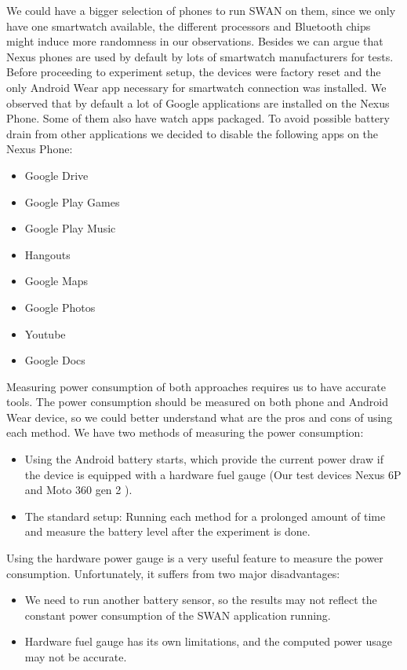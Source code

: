  We could have a bigger selection of phones to run SWAN on them, since we only have one smartwatch available,
 the different processors  and Bluetooth chips might induce more randomness in our observations.
 Besides we can argue that Nexus phones are used by default by lots of smartwatch manufacturers for tests.
 Before proceeding to experiment setup, the devices were factory reset and the only Android Wear app necessary for smartwatch connection was installed.
 We observed that by default a lot of Google applications are installed on the Nexus Phone. Some of them also have watch apps packaged.
 To avoid possible battery drain from other applications we decided to disable the following apps on the Nexus Phone:
 \begin{itemize}
  \item  Google Drive
  \item Google Play Games
  \item Google Play Music
  \item Hangouts
  \item Google Maps
  \item Google Photos
  \item Youtube
  \item Google Docs
 \end{itemize}

 Measuring power consumption of both approaches requires us to have accurate tools.
 The power consumption should be measured on both phone and Android Wear device, so we could better understand what are the pros and cons of using each method.
 We have two methods of measuring the power consumption:
 \begin{itemize}
  \item Using the Android battery starts, which provide the current power draw if the device is equipped with a hardware fuel gauge (Our test devices Nexus 6P and Moto 360 gen 2 )\cite{fuel_gauge}.
  \item The standard setup: Running each method for a prolonged amount of time and measure the battery level after the experiment is done.
 \end{itemize}

 Using the hardware power gauge is a very useful feature to measure the power consumption. Unfortunately, it suffers from two major disadvantages:
 \begin{itemize}
  \item We need to run another battery sensor, so the results may not reflect the constant power consumption of the SWAN application running.
  \item Hardware fuel gauge has its own limitations, and the computed power usage may not be accurate.
 \end{itemize}

